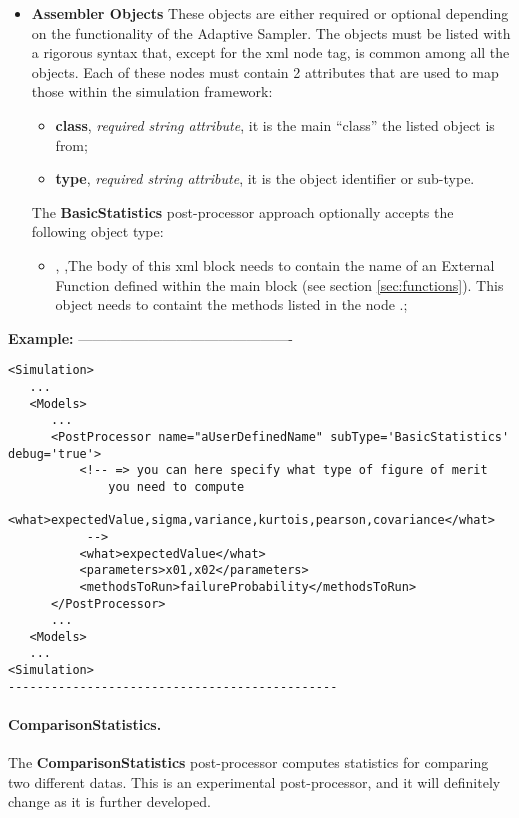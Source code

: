 \begin{itemize}
  \item \textbf{Assembler Objects} These objects are either required or optional
  depending on the functionality of the Adaptive Sampler.
  The objects must be listed with a rigorous syntax that, except for the xml
  node tag, is common among all the objects.
  Each of these nodes must contain 2 attributes that are used to map those
  within the simulation framework:
   \begin{itemize}
    \item \textbf{class}, \textit{required string attribute}, it is the main
    ``class'' the listed object is from;
    \item \textbf{type}, \textit{required string attribute}, it is the object
    identifier or sub-type.
    \end{itemize}
  The \textbf{BasicStatistics} post-processor approach optionally accepts the
  following object type:
   \begin{itemize}
    \item {}, ,The body of
    this xml block needs to contain the name of an External Function defined
    within the  main block (see section \ref{sec:functions}).
    This object needs to containt the methods listed in the node
    .;
    \end{itemize}
\end{itemize}
\textbf{Example:}
----------------------------------------------
\begin{lstlisting}[style=XML]
<Simulation>
   ...
   <Models>
      ...
      <PostProcessor name="aUserDefinedName" subType='BasicStatistics'  debug='true'>
          <!-- => you can here specify what type of figure of merit
              you need to compute
             <what>expectedValue,sigma,variance,kurtois,pearson,covariance</what>
           -->
          <what>expectedValue</what>
          <parameters>x01,x02</parameters>
          <methodsToRun>failureProbability</methodsToRun>
      </PostProcessor>
      ...
   <Models>
   ...
<Simulation>
----------------------------------------------
\end{lstlisting}

\paragraph{ComparisonStatistics.}
\label{ComparisonStatistics}
The \textbf{ComparisonStatistics} post-processor computes statistics
for comparing two different datas.  This is an experimental
post-processor, and it will definitely change as it is further
developed.

